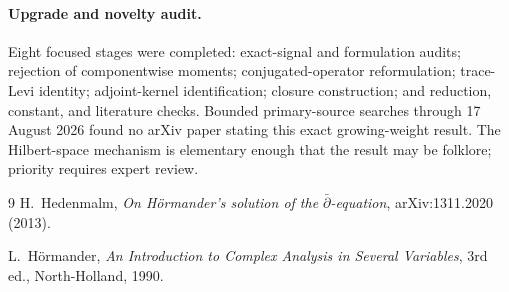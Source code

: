 \documentclass[10pt,a4paper]{article}
\newcommand{\dbar}{\bar\partial}
\begin{document}
\paragraph{Upgrade and novelty audit.}
Eight focused stages were completed: exact-signal and formulation audits;
rejection of componentwise moments; conjugated-operator reformulation;
trace-Levi identity; adjoint-kernel identification; closure construction;
and reduction, constant, and literature checks.  Bounded primary-source
searches through 17 August 2026 found no arXiv paper stating this exact
growing-weight result.  The Hilbert-space mechanism is elementary enough
that the result may be folklore; priority requires expert review.

\begin{thebibliography}{9}\small
{}
H.~Hedenmalm,
\emph{On H\"ormander's solution of the $\dbar$-equation},
arXiv:1311.2020 (2013).

L.~H\"ormander,
\emph{An Introduction to Complex Analysis in Several Variables},
3rd ed., North-Holland, 1990.
\end{thebibliography}
\end{document}
